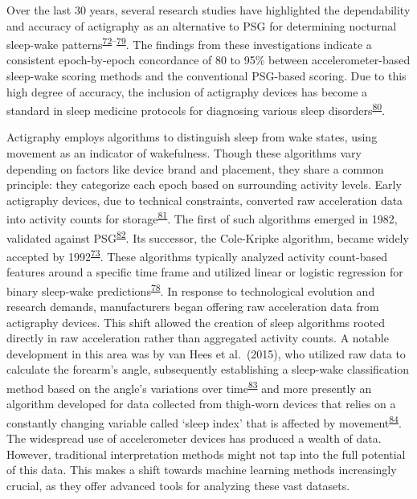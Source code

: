 \documentclass[
  10pt,
]{scrbook}
\begin{document}
Over the last 30 years, several research studies have highlighted the
dependability and accuracy of actigraphy as an alternative to PSG for
determining nocturnal sleep-wake
patterns\textsuperscript{\protect\hyperlink{ref-sadeh_activity-based_1994}{72}--\protect\hyperlink{ref-granovsky_actigraphy-based_2018}{79}}.
The findings from these investigations indicate a consistent
epoch-by-epoch concordance of 80 to 95\% between accelerometer-based
sleep-wake scoring methods and the conventional PSG-based scoring. Due
to this high degree of accuracy, the inclusion of actigraphy devices has
become a standard in sleep medicine protocols for diagnosing various
sleep disorders\textsuperscript{\protect\hyperlink{ref-smith_2018}{80}}.

Actigraphy employs algorithms to distinguish sleep from wake states,
using movement as an indicator of wakefulness. Though these algorithms
vary depending on factors like device brand and placement, they share a
common principle: they categorize each epoch based on surrounding
activity levels. Early actigraphy devices, due to technical constraints,
converted raw acceleration data into activity counts for
storage\textsuperscript{\protect\hyperlink{ref-neishabouri_2022}{81}}.
The first of such algorithms emerged in 1982, validated against
PSG\textsuperscript{\protect\hyperlink{ref-webster_activity-based_1982}{82}}.
Its successor, the Cole-Kripke algorithm, became widely accepted by
1992\textsuperscript{\protect\hyperlink{ref-cole_automatic_1992}{73}}.
These algorithms typically analyzed activity count-based features around
a specific time frame and utilized linear or logistic regression for
binary sleep-wake
predictions\textsuperscript{\protect\hyperlink{ref-sazonov_activity-based_2004}{78}}.
In response to technological evolution and research demands,
manufacturers began offering raw acceleration data from actigraphy
devices. This shift allowed the creation of sleep algorithms rooted
directly in raw acceleration rather than aggregated activity counts. A
notable development in this area was by van Hees et al.~(2015), who
utilized raw data to calculate the forearm's angle, subsequently
establishing a sleep-wake classification method based on the angle's
variations over
time\textsuperscript{\protect\hyperlink{ref-hees_novel_2015}{83}} and
more presently an algorithm developed for data collected from thigh-worn
devices that relies on a constantly changing variable called `sleep
index' that is affected by
movement\textsuperscript{\protect\hyperlink{ref-johansson_development_2023}{84}}.
The widespread use of accelerometer devices has produced a wealth of
data. However, traditional interpretation methods might not tap into the
full potential of this data. This makes a shift towards machine learning
methods increasingly crucial, as they offer advanced tools for analyzing
these vast datasets.
\end{document}
